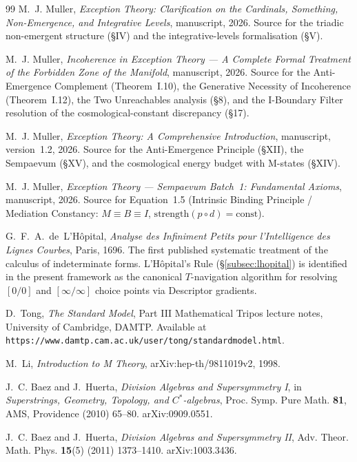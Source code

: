 \documentclass[11pt,a4paper]{article}
\theoremstyle{definition}
\theoremstyle{remark}
\begin{document}
\begin{thebibliography}{99}
M.~J. Muller,
\emph{Exception Theory: Clarification on the Cardinals, Something, Non-Emergence, and Integrative Levels}, manuscript, 2026.
Source for the triadic non-emergent structure (\S IV) and the integrative-levels formalisation (\S V).

M.~J. Muller,
\emph{Incoherence in Exception Theory --- A Complete Formal Treatment of the Forbidden Zone of the Manifold}, manuscript, 2026.
Source for the Anti-Emergence Complement (Theorem~I.10), the Generative Necessity of Incoherence (Theorem~I.12), the Two Unreachables analysis (\S 8), and the I-Boundary Filter resolution of the cosmological-constant discrepancy (\S 17).

M.~J. Muller,
\emph{Exception Theory: A Comprehensive Introduction}, manuscript, version~1.2, 2026.
Source for the Anti-Emergence Principle (\S XII), the Sempaevum (\S XV), and the cosmological energy budget with M-states (\S XIV).

M.~J. Muller,
\emph{Exception Theory --- Sempaevum Batch~1: Fundamental Axioms}, manuscript, 2026.
Source for Equation~1.5 (Intrinsic Binding Principle / Mediation Constancy: $M \equiv B \equiv I$, $\mathrm{strength}(p \circ d) = \mathrm{const}$).

G.~F.~A.~de~L'H\^opital,
\emph{Analyse des Infiniment Petits pour l'Intelligence des Lignes Courbes},
Paris, 1696.
The first published systematic treatment of the calculus of indeterminate forms. L'H\^opital's Rule (\S\ref{subsec:lhopital}) is identified in the present framework as the canonical $T$-navigation algorithm for resolving $[0/0]$ and $[\infty/\infty]$ choice points via Descriptor gradients.

D.~Tong,
\emph{The Standard Model},
Part III Mathematical Tripos lecture notes, University of Cambridge, DAMTP.
Available at \texttt{https://www.damtp.cam.ac.uk/user/tong/standardmodel.html}.

M.~Li,
\emph{Introduction to M Theory},
arXiv:hep-th/9811019v2, 1998.

J.~C. Baez and J.~Huerta,
\emph{Division Algebras and Supersymmetry I},
in \emph{Superstrings, Geometry, Topology, and $C^{*}$-algebras},
Proc. Symp. Pure Math. {\bf 81}, AMS, Providence (2010) 65--80.
arXiv:0909.0551.

J.~C. Baez and J.~Huerta,
\emph{Division Algebras and Supersymmetry II},
Adv. Theor. Math. Phys. {\bf 15}(5) (2011) 1373--1410.
arXiv:1003.3436.


\end{thebibliography}
\end{document}
